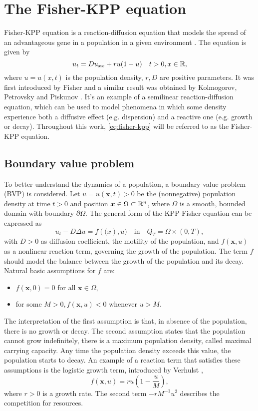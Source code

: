 \section{The Fisher-KPP equation}
Fisher-KPP equation is a reaction-diffusion equation that models the spread of an advantageous gene in a population in a given environment \cite{SalsaVerziniPDE}. The equation is given by
\begin{equation}
    u_t = Du_{xx} + ru(1-u) \quad t > 0, x \in \mathbb{R},
    \label{eq:fisher-kpp}
\end{equation}
where $u = u(x, t)$ is the population density, $r, D$ are positive parameters. It was first introduced by Fisher \cite{Fisher1937} and a similar result was obtained by Kolmogorov, Petrovsky and Piskunov \cite{KPP1937}. It's an example of a semilinear reaction-diffusion equation, which can be used to model phenomena in which some density experience both a diffusive effect (e.g. dispersion) and a reactive one (e.g. growth or decay). Throughout this work, \eqref{eq:fisher-kpp} will be referred to as the Fisher-KPP equation.

\subsection{Boundary value problem}
To better understand the dynamics of a population, a boundary value problem (BVP) is considered. Let \(u = u(\bm{x}, t) > 0\) be the (nonnegative) population density at time \(t > 0\) and position \(\bm{x} \in \Omega \subset \mathbb{R}^n\), where \(\Omega\) is a smooth, bounded domain with boundary \(\partial \Omega\). 
The general form of the KPP-Fisher equation can be expressed as 
\begin{equation}
    u_t - D \Delta u = f(\bm(x), u) \quad \text{in} \quad Q_T = \Omega \times (0, T),
    \label{eq:fisher-kpp-general}
\end{equation}
with \(D > 0\) as diffusion coefficient, the motility of the population, and \(f(\bm{x}, u)\) as a nonlinear reaction term, governing the growth of the population. The term \(f\) should model the balance between the growth of the population and its decay. Natural basic assumptions for \(f\) are:
\begin{itemize}
    \item \(f(\bm{x}, 0) = 0\) for all \(\bm{x} \in \Omega\),
    \item for some \(M > 0, f(\bm{x}, u) < 0\) whenever \(u > M\).
\end{itemize}
The interpretation of the first assumption is that, in absence of the population, there is no growth or decay. The second assumption states that the population cannot grow indefinitely, there is a maximum population density, called maximal carrying capacity. Any time the population density exceeds this value, the population starts to decay. An example of a reaction term that satisfies these assumptions is the logistic growth term, introduced by Verhulst \cite{Verhulst1847}, 
\begin{equation}
    f(\bm{x}, u) = ru\left(1 - \frac{u}{M}\right), 
\end{equation}
where \(r > 0\) is a growth rate. The second term \(-rM^{-1}u^2\) describes the competition for resources.

